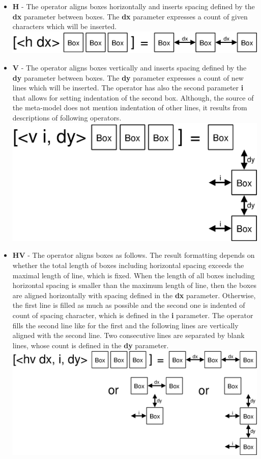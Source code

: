 \documentclass[12pt,notitlepage,a4paper]{report}
\begin{document}
\begin{itemize}
\item \textbf{H} - The operator aligns boxes horizontally and inserts spacing defined by the \textbf{dx} parameter between boxes. The \textbf{dx} parameter expresses a count of given characters which will be inserted.
\includegraphics[scale=0.4]{pictures/PPML-H.eps}
\item \textbf{V} - The operator aligns boxes vertically and inserts spacing defined by the \textbf{dy} parameter between boxes. The \textbf{dy} parameter expresses a count of new lines which will be inserted. The operator has also the second  parameter \textbf{i} that allows for setting indentation of the second box. Although, the source of the meta-model does not mention indentation of other lines,  it results from descriptions of following operators.
\includegraphics[scale=0.4]{pictures/PPML-V.eps}
\item \textbf{HV} - The operator aligns boxes as follows. The result formatting depends on whether the total length of boxes including horizontal spacing exceeds the maximal length of line, which is fixed. When the length of all boxes including horizontal spacing is smaller than the maximum length of line, then the boxes are aligned horizontally with spacing defined in the \textbf{dx} parameter. Otherwise, the first line is filled as much as possible and the second one is indented of count of spacing character, which is defined in the \textbf{i} parameter. The operator fills the second line like for the first and the following lines are vertically aligned with the second line. Two consecutive lines are separated by blank lines, whose count is defined in the \textbf{dy} parameter.
\includegraphics[scale=0.4]{pictures/PPML-HV.eps}

\end{itemize}
\end{document}
